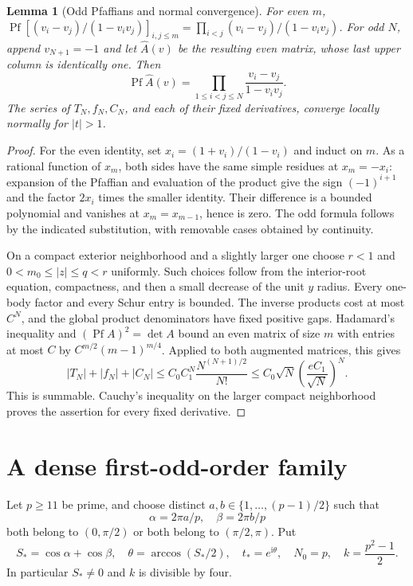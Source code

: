 \documentclass[11pt]{article}
\numberwithin{equation}{section}
\newtheorem{lemma}[theorem]{Lemma}
\theoremstyle{definition}
\newcommand{\ii}{\mathrm i}
\newcommand{\Pf}{\operatorname{Pf}}
\begin{document}
\begin{lemma}[Odd Pfaffians and normal convergence]\label{lem:schur}
For even $m$,
$\Pf[(v_i-v_j)/(1-v_iv_j)]_{i,j\le m}
=\prod_{i<j}(v_i-v_j)/(1-v_iv_j)$.
For odd $N$, append $v_{N+1}=-1$ and let $\widehat A(v)$ be the
resulting even matrix, whose last upper column is identically one.
Then
\[
 \Pf\widehat A(v)=\prod_{1\le i<j\le N}\frac{v_i-v_j}{1-v_iv_j}.
\]
The series of $T_N,f_N,C_N$, and each of their fixed derivatives,
converge locally normally for $|t|>1$.
\end{lemma}
\begin{proof}
For the even identity, set $x_i=(1+v_i)/(1-v_i)$ and induct on
$m$. As a rational function of $x_m$, both sides have the same
simple residues at $x_m=-x_i$: expansion of the Pfaffian and
evaluation of the product give the sign $(-1)^{i+1}$ and the
factor $2x_i$ times the smaller identity. Their difference is a
bounded polynomial and vanishes at $x_m=x_{m-1}$, hence is zero.
The odd formula follows by the indicated substitution, with
removable cases obtained by continuity.

On a compact exterior neighborhood and a slightly larger one choose
$r<1$ and $0<m_0\le |z|\le q<r$ uniformly. Such choices follow
from the interior-root equation, compactness, and then a small
decrease of the unit $y$ radius. Every one-body factor and every
Schur entry is bounded. The inverse products cost at most $C^N$,
and the global product denominators have fixed positive gaps.
Hadamard's inequality and $(\Pf A)^2=\det A$ bound an even
matrix of size $m$ with entries at most $C$ by
$C^{m/2}(m-1)^{m/4}$. Applied to both augmented matrices, this gives
\[
 |T_N|+|f_N|+|C_N|
 \le C_0 C_1^N\frac{N^{(N+1)/2}}{N!}
 \le C_0\sqrt N\left(\frac{eC_1}{\sqrt N}\right)^N.
\]
This is summable. Cauchy's inequality on the larger compact
neighborhood proves the assertion for every fixed derivative.
\end{proof}

\section{A dense first-odd-order family}\label{sec:arithmetic}
Let $p\ge11$ be prime, and choose distinct
$a,b\in\{1,\ldots,(p-1)/2\}$ such that
\[
 \alpha=2\pi a/p,\quad\beta=2\pi b/p
\]
both belong to $(0,\pi/2)$ or both belong to $(\pi/2,\pi)$. Put
\[
 S_* =\cos\alpha+\cos\beta,
 \quad \theta=\arccos(S_*/2),\quad t_*=e^{\ii\theta},
 \quad N_0=p,\quad k=\frac{p^2-1}{2}.
\]
In particular $S_*\ne0$ and $k$ is divisible by four.
\end{document}
